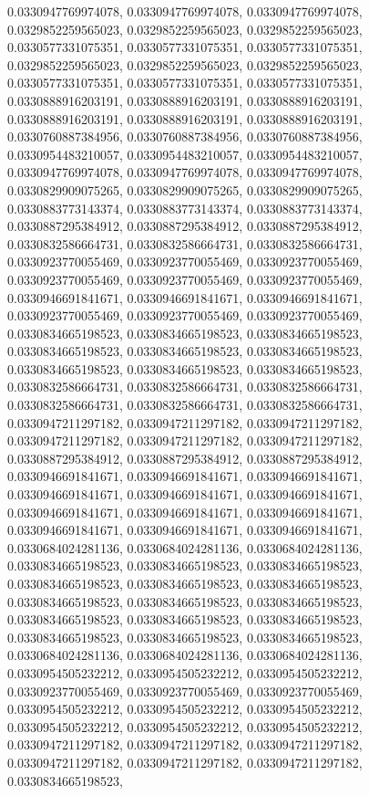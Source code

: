\documentclass[
  ,man]{apa6}
\begin{document}
0.0330947769974078, 0.0330947769974078, 0.0330947769974078, 0.0329852259565023, 0.0329852259565023, 0.0329852259565023, 0.0330577331075351, 0.0330577331075351, 0.0330577331075351, 0.0329852259565023, 0.0329852259565023, 0.0329852259565023, 0.0330577331075351, 0.0330577331075351, 0.0330577331075351, 0.0330888916203191, 0.0330888916203191, 0.0330888916203191, 0.0330888916203191, 0.0330888916203191, 0.0330888916203191, 0.0330760887384956, 0.0330760887384956, 0.0330760887384956, 0.0330954483210057, 0.0330954483210057,
0.0330954483210057, 0.0330947769974078, 0.0330947769974078, 0.0330947769974078, 0.0330829909075265, 0.0330829909075265, 0.0330829909075265, 0.0330883773143374, 0.0330883773143374, 0.0330883773143374, 0.0330887295384912, 0.0330887295384912, 0.0330887295384912, 0.0330832586664731, 0.0330832586664731, 0.0330832586664731, 0.0330923770055469, 0.0330923770055469, 0.0330923770055469, 0.0330923770055469, 0.0330923770055469, 0.0330923770055469, 0.0330946691841671, 0.0330946691841671, 0.0330946691841671, 0.0330923770055469,
0.0330923770055469, 0.0330923770055469, 0.0330834665198523, 0.0330834665198523, 0.0330834665198523, 0.0330834665198523, 0.0330834665198523, 0.0330834665198523, 0.0330834665198523, 0.0330834665198523, 0.0330834665198523, 0.0330832586664731, 0.0330832586664731, 0.0330832586664731, 0.0330832586664731, 0.0330832586664731, 0.0330832586664731, 0.0330947211297182, 0.0330947211297182, 0.0330947211297182, 0.0330947211297182, 0.0330947211297182, 0.0330947211297182, 0.0330887295384912, 0.0330887295384912, 0.0330887295384912,
0.0330946691841671, 0.0330946691841671, 0.0330946691841671, 0.0330946691841671, 0.0330946691841671, 0.0330946691841671, 0.0330946691841671, 0.0330946691841671, 0.0330946691841671, 0.0330946691841671, 0.0330946691841671, 0.0330946691841671, 0.0330684024281136, 0.0330684024281136, 0.0330684024281136, 0.0330834665198523, 0.0330834665198523, 0.0330834665198523, 0.0330834665198523, 0.0330834665198523, 0.0330834665198523, 0.0330834665198523, 0.0330834665198523, 0.0330834665198523, 0.0330834665198523, 0.0330834665198523,
0.0330834665198523, 0.0330834665198523, 0.0330834665198523, 0.0330834665198523, 0.0330684024281136, 0.0330684024281136, 0.0330684024281136, 0.0330954505232212, 0.0330954505232212, 0.0330954505232212, 0.0330923770055469, 0.0330923770055469, 0.0330923770055469, 0.0330954505232212, 0.0330954505232212, 0.0330954505232212, 0.0330954505232212, 0.0330954505232212, 0.0330954505232212, 0.0330947211297182, 0.0330947211297182, 0.0330947211297182, 0.0330947211297182, 0.0330947211297182, 0.0330947211297182, 0.0330834665198523,
\end{document}
